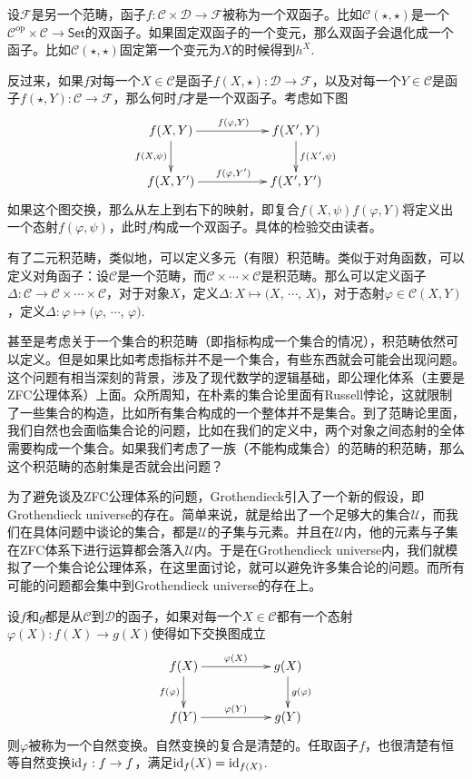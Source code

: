 设$\mathcal{F}$是另一个范畴，函子$f:\mathcal{C}\times \mathcal{D}\to \mathcal{F}$被称为一个双函子。比如$\mathcal{C}(\star,\star)$是一个$\mathcal{C}^\text{op}\times \mathcal{C}\to \mathsf{Set}$的双函子。如果固定双函子的一个变元，那么双函子会退化成一个函子。比如$\mathcal{C}(\star,\star)$固定第一个变元为$X$的时候得到$h^X$.

反过来，如果$f$对每一个$X\in \mathcal{C}$是函子$f(X,\star):\mathcal{D}\to \mathcal{F}$，以及对每一个$Y\in \mathcal{C}$是函子$f(\star,Y):\mathcal{C}\to \mathcal{F}$，那么何时$f$才是一个双函子。考虑如下图
\[
\begin{xy}
	\xymatrix{
		f(X,Y)\ar[rr]^{f(\varphi,Y)} \ar[d]_{f(X,\psi)}&&f(X',Y) \ar[d]^{f(X',\psi)}\\
		f(X,Y')\ar[rr]^{f(\varphi,Y')}&&f(X',Y')
	}
\end{xy}
\]
如果这个图交换，那么从左上到右下的映射，即复合$f(X,\psi)f(\varphi,Y)$将定义出一个态射$f(\varphi,\psi)$，此时$f$构成一个双函子。具体的检验交由读者。

\para \label{digf}有了二元积范畴，类似地，可以定义多元（有限）积范畴。类似于对角函数，可以定义对角函子：设$\mathcal{C}$是一个范畴，而$\mathcal{C}\times \cdots \times \mathcal{C}$是积范畴。那么可以定义函子$\Delta:\mathcal{C}\to \mathcal{C}\times \cdots \times \mathcal{C}$，对于对象$X$，定义$\Delta:X\mapsto (X$, $\cdots$, $X)$，对于态射$\varphi\in \mathcal{C}(X,Y)$，定义$\Delta: \varphi \mapsto (\varphi$, $\cdots$, $\varphi)$.

甚至是考虑关于一个集合的积范畴（即指标构成一个集合的情况），积范畴依然可以定义。但是如果比如考虑指标并不是一个集合，有些东西就会可能会出现问题。这个问题有相当深刻的背景，涉及了现代数学的逻辑基础，即公理化体系（主要是ZFC公理体系）上面。众所周知，在朴素的集合论里面有Russell悖论，这就限制了一些集合的构造，比如所有集合构成的一个整体并不是集合。到了范畴论里面，我们自然也会面临集合论的问题，比如在我们的定义中，两个对象之间态射的全体需要构成一个集合。如果我们考虑了一族（不能构成集合）的范畴的积范畴，那么这个积范畴的态射集是否就会出问题？

为了避免谈及ZFC公理体系的问题，Grothendieck引入了一个新的假设，即Grothendieck universe的存在。简单来说，就是给出了一个足够大的集合$\mathscr{U}$，而我们在具体问题中谈论的集合，都是$\mathscr{U}$的子集与元素。并且在$\mathscr{U}$内，他的元素与子集在ZFC体系下进行运算都会落入$\mathscr{U}$内。于是在Grothendieck universe内，我们就模拟了一个集合论公理体系，在这里面讨论，就可以避免许多集合论的问题。而所有可能的问题都会集中到Grothendieck universe的存在上。

\para 设$f$和$g$都是从$\mathcal{C}$到$\mathcal{D}$的函子，如果对每一个$X\in \mathcal{C}$都有一个态射$\varphi(X):f(X)\to g(X)$使得如下交换图成立
\[
\begin{xy}
	\xymatrix{
		f(X)\ar[rr]^{\varphi(X)} \ar[d]_{f(\varphi)}&&g(X) \ar[d]^{g(\varphi)}\\
		f(Y)\ar[rr]^{\varphi(Y)}&&g(Y)
	}
\end{xy}
\]
则$\varphi$被称为一个自然变换。自然变换的复合是清楚的。任取函子$f$，也很清楚有恒等自然变换$\operatorname{id}_f:f\to f$，满足$\operatorname{id}_f(X)=\operatorname{id}_{f(X)}$.

